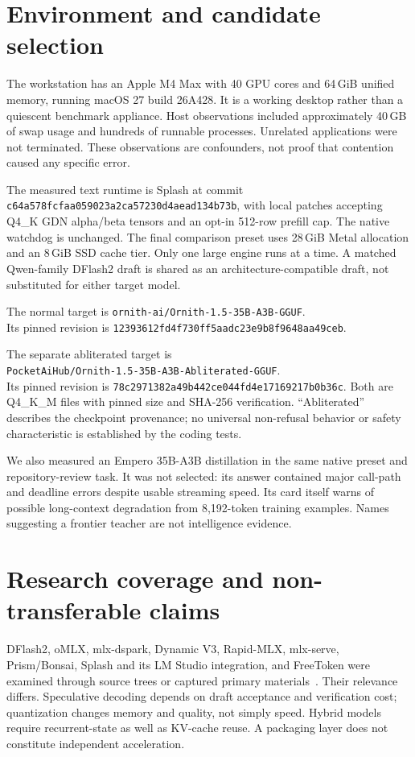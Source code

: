 \documentclass[11pt]{article}
\begin{document}
\section{Environment and candidate selection}
The workstation has an Apple M4 Max with 40 GPU cores and 64\,GiB unified memory, running macOS 27 build 26A428. It is a working desktop rather than a quiescent benchmark appliance. Host observations included approximately 40\,GB of swap usage and hundreds of runnable processes. Unrelated applications were not terminated. These observations are confounders, not proof that contention caused any specific error.

The measured text runtime is Splash at commit \texttt{c64a578fcfaa059023a2ca57230d4aead134b73b}, with local patches accepting Q4\_K GDN alpha/beta tensors and an opt-in 512-row prefill cap. The native watchdog is unchanged. The final comparison preset uses 28\,GiB Metal allocation and an 8\,GiB SSD cache tier. Only one large engine runs at a time. A matched Qwen-family DFlash2 draft is shared as an architecture-compatible draft, not substituted for either target model.

The normal target is \nolinkurl{ornith-ai/Ornith-1.5-35B-A3B-GGUF}.\\
Its pinned revision is \texttt{12393612fd4f730ff5aadc23e9b8f9648aa49ceb}.

The separate abliterated target is\\
\nolinkurl{PocketAiHub/Ornith-1.5-35B-A3B-Abliterated-GGUF}.\\
Its pinned revision is \texttt{78c2971382a49b442ce044fd4e17169217b0b36c}. Both are Q4\_K\_M files with pinned size and SHA-256 verification. ``Abliterated'' describes the checkpoint provenance; no universal non-refusal behavior or safety characteristic is established by the coding tests.

We also measured an Empero 35B-A3B distillation in the same native preset and repository-review task. It was not selected: its answer contained major call-path and deadline errors despite usable streaming speed. Its card itself warns of possible long-context degradation from 8,192-token training examples. Names suggesting a frontier teacher are not intelligence evidence.

\section{Research coverage and non-transferable claims}
DFlash2, oMLX, mlx-dspark, Dynamic V3, Rapid-MLX, mlx-serve, Prism/Bonsai, Splash and its LM Studio integration, and FreeToken were examined through source trees or captured primary materials~\cite{dflash,omlx,dspark,dynamic,rapid,serve,prism,splash,lmstudio,freetoken}. Their relevance differs. Speculative decoding depends on draft acceptance and verification cost; quantization changes memory and quality, not simply speed. Hybrid models require recurrent-state as well as KV-cache reuse. A packaging layer does not constitute independent acceleration.
\end{document}
